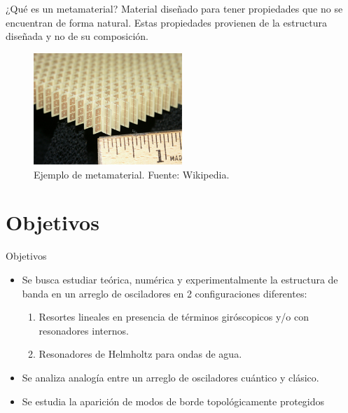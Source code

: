 \documentclass[aspectratio=43]{beamer}
\begin{document}
    \begin{frame}{¿Qué es un metamaterial?}
    Material diseñado para tener propiedades que no se encuentran de forma natural. Estas propiedades provienen de la estructura diseñada y no de su composición. 
    \begin{figure}
            \centering
            \includegraphics[width=0.5\textwidth]{Metamaterial.jpg}
            \caption{Ejemplo de metamaterial. Fuente: Wikipedia.} 
            \label{matematerial}
        \end{figure}
    \end{frame}
   \section{Objetivos}
   \begin{frame}{Objetivos}
       \begin{itemize}
           \item Se busca estudiar teórica, numérica y experimentalmente la estructura de banda en un arreglo de osciladores en 2 configuraciones diferentes:
           \begin{enumerate}
               \item  Resortes lineales en presencia de términos giróscopicos y/o con resonadores internos. 
               \item Resonadores de Helmholtz para ondas de agua. 
           \end{enumerate}
           \item Se analiza analogía entre un arreglo de osciladores cuántico y clásico.
           \item Se estudia la aparición de modos de borde topológicamente protegidos
 

       \end{itemize}
   \end{frame}  
   
   
\end{document}

